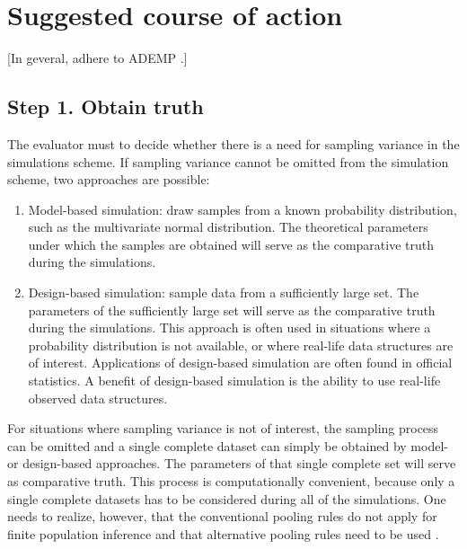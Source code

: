 \documentclass[bimj,fleqn]{w-art}
\begin{document}

\section{Suggested course of action}

[In geveral, adhere to ADEMP \citep{morr18}.]


\subsection{Step 1. Obtain truth}

The evaluator must to decide whether there is a need for sampling variance in the simulations scheme. If sampling variance cannot be omitted from the simulation scheme, two approaches are possible:
\begin{enumerate}
  \item Model-based simulation: draw samples from a known probability distribution, such as the multivariate normal distribution. The theoretical parameters under which the samples are obtained will serve as the comparative truth during the simulations. 
  \item Design-based simulation: sample data from a sufficiently large set. The parameters of the sufficiently large set will serve as the comparative truth during the simulations. This approach is often used in situations where a probability distribution is not available, or where real-life data structures are of interest. Applications of design-based simulation are often found in official statistics. A benefit of design-based simulation is the ability to use real-life observed data structures. 
\end{enumerate}
For situations where sampling variance is not of interest, the sampling process can be omitted and a single complete dataset can simply be obtained by model- or design-based approaches. The parameters of that single complete set will serve as comparative truth. This process is computationally convenient, because only a single complete datasets has to be considered during all of the simulations. One needs to realize, however, that the conventional pooling rules \citep[cf.][p. 76-77]{rubi87} do not apply for finite population inference and that alternative pooling rules need to be used \citep{raghunathan2003multiple,vink14}. 


\end{document}
